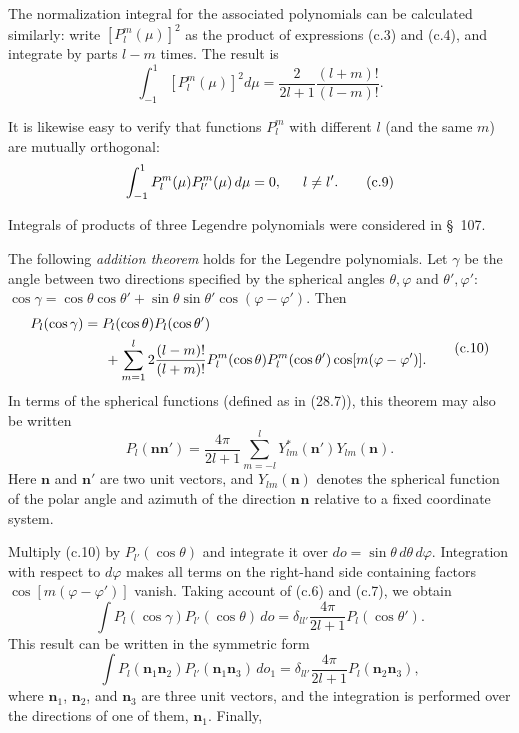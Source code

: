 The normalization integral for the associated polynomials can be calculated
similarly: write $[P_l^m(\mu)]^2$ as the product of expressions (c.3) and
(c.4), and integrate by parts $l-m$ times. The result is
\begin{equation}
 \int_{-1}^{1}[P_l^m(\mu)]^2d\mu
 =\frac2{2l+1}\frac{(l+m)!}{(l-m)!}.
 \tag{c.8}
\end{equation}

It is likewise easy to verify that functions $P_l^m$ with different $l$ (and
the same $m$) are mutually orthogonal:
\begin{equation}
 \int_{-1}^{1}P_l^m(\mu)P_{l'}^m(\mu)\,d\mu=0,
 \hspace{1.5em}l\ne l'.
 \tag{c.9}
\end{equation}

Integrals of products of three Legendre polynomials were considered in
\S~107.

The following \emph{addition theorem} holds for the Legendre polynomials. Let
$\gamma$ be the angle between two directions specified by the spherical
angles $\theta,\varphi$ and $\theta',\varphi'$:
$\cos\gamma=\cos\theta\cos\theta'+\sin\theta\sin\theta'
\cos(\varphi-\varphi')$. Then
\begin{equation}
 \begin{split}
 P_l(\cos\gamma)&=P_l(\cos\theta)P_l(\cos\theta')\\
 &\hspace{1.5em}+\sum_{m=1}^{l}2\frac{(l-m)!}{(l+m)!}
 P_l^m(\cos\theta)P_l^m(\cos\theta')
 \cos[m(\varphi-\varphi')].
 \end{split}
 \tag{c.10}
\end{equation}
In terms of the spherical functions (defined as in (28.7)), this theorem may
also be written
\begin{equation}
 P_l(\mathbf n\mathbf n')=\frac{4\pi}{2l+1}
 \sum_{m=-l}^{l}Y_{lm}^*(\mathbf n')Y_{lm}(\mathbf n).
 \tag{c.11}
\end{equation}
Here $\mathbf n$ and $\mathbf n'$ are two unit vectors, and
$Y_{lm}(\mathbf n)$ denotes the spherical function of the polar angle and
azimuth of the direction $\mathbf n$ relative to a fixed coordinate system.

Multiply (c.10) by $P_{l'}(\cos\theta)$ and integrate it over
$do=\sin\theta\,d\theta\,d\varphi$. Integration with respect to $d\varphi$
makes all terms on the right-hand side containing factors
$\cos[m(\varphi-\varphi')]$ vanish. Taking account of (c.6) and (c.7), we
obtain
\[
 \int P_l(\cos\gamma)P_{l'}(\cos\theta)\,do
 =\delta_{ll'}\frac{4\pi}{2l+1}P_l(\cos\theta').
\]
This result can be written in the symmetric form
\begin{equation}
 \int P_l(\mathbf n_1\mathbf n_2)P_{l'}(\mathbf n_1\mathbf n_3)\,do_1
 =\delta_{ll'}\frac{4\pi}{2l+1}P_l(\mathbf n_2\mathbf n_3),
 \tag{c.12}
\end{equation}
where $\mathbf n_1$, $\mathbf n_2$, and $\mathbf n_3$ are three unit vectors,
and the integration is performed over the directions of one of them,
$\mathbf n_1$. Finally,

